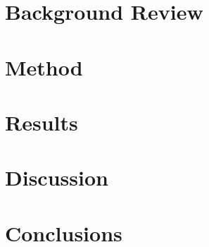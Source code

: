 \documentclass[conference,letterpaper]{IEEEtran}
\begin{document}
\section{Background Review} \label{sec:background}


\section{Method} \label{sec:method}


\section{Results} \label{sec:results}


\section{Discussion} \label{sec:discussion}


\section{Conclusions} \label{sec:conclusions}


%

%
\end{document}
